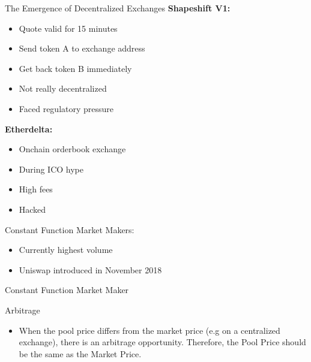 \documentclass[]{beamer}
\begin{document}
\begin{frame}{The Emergence of Decentralized Exchanges}
\textbf{Shapeshift V1:}
\begin{itemize}
	\item Quote valid for 15 minutes
	\item Send token A to exchange address
	\item Get back token B immediately
	\item Not really decentralized
	\item Faced regulatory pressure
\end{itemize}

\textbf{Etherdelta:}
\begin{itemize}
	\item Onchain orderbook exchange %
	\item During ICO hype
	\item High fees
	\item Hacked
\end{itemize}

Constant Function Market Makers:
\begin{itemize}
	\item Currently highest volume
	\item Uniswap introduced in November 2018
\end{itemize}
\end{frame}

\begin{frame}{Constant Function Market Maker}

	\begin{figure}	
		\centering
		
	\end{figure}


\end{frame}


\begin{frame}{Arbitrage}
	\begin{figure}
		\begin{tikzpicture}
		
		\end{tikzpicture}
	\end{figure}
	\begin{itemize}
		\item When the pool price differs from the market price (e.g on a centralized exchange), there is an arbitrage opportunity. Therefore, the Pool Price should be the same as the Market Price.
	\end{itemize}	
\end{frame}
\end{document}
